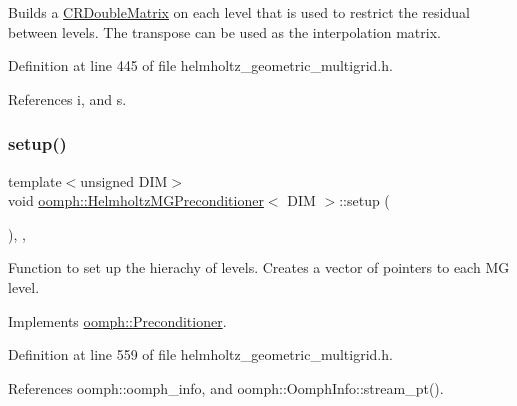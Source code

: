 Builds a \hyperlink{classoomph_1_1CRDoubleMatrix}{C\+R\+Double\+Matrix} on each level that is used to restrict the residual between levels. The transpose can be used as the interpolation matrix. 



Definition at line 445 of file helmholtz\+\_\+geometric\+\_\+multigrid.\+h.



References i, and s.

\mbox{\label{classoomph_1_1HelmholtzMGPreconditioner_aba7a7fb0549452ac56c7e97bd5557c3f}} 
\subsubsection{\texorpdfstring{setup()}{setup()}}
{\footnotesize\ttfamily template$<$unsigned D\+IM$>$ \\
void \hyperlink{classoomph_1_1HelmholtzMGPreconditioner}{oomph\+::\+Helmholtz\+M\+G\+Preconditioner}$<$ D\+IM $>$\+::setup (\begin{DoxyParamCaption}{ }\end{DoxyParamCaption})\hspace{0.3cm}{\ttfamily [inline]}, {\ttfamily [private]}, {\ttfamily [virtual]}}



Function to set up the hierachy of levels. Creates a vector of pointers to each MG level. 



Implements \hyperlink{classoomph_1_1Preconditioner_af4886f4efe510e5c9b0eb19422943588}{oomph\+::\+Preconditioner}.



Definition at line 559 of file helmholtz\+\_\+geometric\+\_\+multigrid.\+h.



References oomph\+::oomph\+\_\+info, and oomph\+::\+Oomph\+Info\+::stream\+\_\+pt().

\mbox{\label{classoomph_1_1HelmholtzMGPreconditioner_a2436c6189b4cda832bf28471f4f9e23c}} 
